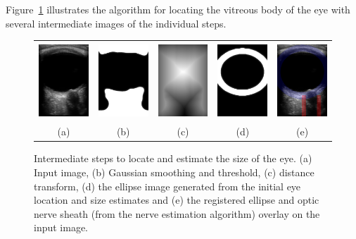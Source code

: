 \documentclass{llncs}
\begin{document}
Figure~\ref{fig:algorithm-eye} illustrates the algorithm for locating the
vitreous body of the eye with several intermediate images of the individual
steps. 
\begin{figure}
\centering
\begin{tabular}{ccccc}
\includegraphics[height=1.12in]{019.png} &
\includegraphics[height=1.12in]{019-eye-smooth.png} &
\includegraphics[height=1.12in]{019-eye-distance.png} &         
\includegraphics[height=1.12in]{019-eye-moving.png} &
\includegraphics[height=1.12in]{019-overlay.png}\\
(a) & (b) & (c) & (d) & (e)
\end{tabular}
\caption{
\label{fig:algorithm-eye}
Intermediate steps to locate and estimate the size of the eye. (a) Input image,
(b) Gaussian smoothing and threshold, (c) distance transform, (d) the ellipse
image generated from the initial eye location and size estimates and (e) the
registered ellipse and optic nerve sheath (from the nerve estimation algorithm)
overlay on the input image.
}
\end{figure}
\end{document}
